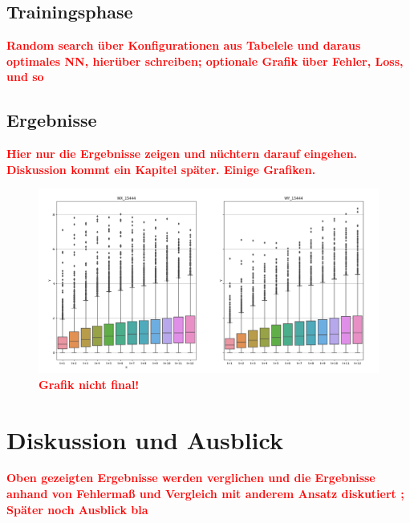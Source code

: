 \documentclass[
12pt, %
toc=listofnumbered, %
toc=chapterentrydotfill, %
numbers=noenddot, %
captions=tableheading, %
bibliography=numbered
]{scrreprt}
\let\Oldsection\section
\renewcommand{\section}{\FloatBarrier\Oldsection}
\newcommand{\highlight}[1]{\textbf{\textcolor{red}{#1}}}
\begin{document}
\section{Trainingsphase}
\highlight{Random search über Konfigurationen aus Tabelele und daraus optimales NN, hierüber schreiben; 
optionale Grafik über Fehler, Loss, und so}

\section{Ergebnisse}
\highlight{Hier nur die Ergebnisse zeigen und nüchtern darauf eingehen. Diskussion kommt ein Kapitel später. Einige Grafiken.}

\begin{figure}[tph]
	\begin{center}
		\includegraphics[width=0.9\linewidth]{./images/güte_über_zeit.png}
		\caption{\highlight{Grafik nicht final!}}
		\label{fig:güte_über_zeit}
	\end{center}
\end{figure}


\chapter{Diskussion und Ausblick}
\highlight{Oben gezeigten Ergebnisse werden verglichen und die Ergebnisse anhand von Fehlermaß und Vergleich mit anderem Ansatz diskutiert ;
Später noch Ausblick bla}
\end{document}
